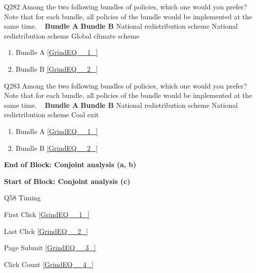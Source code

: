 \documentclass{article} %
\begin{document}
\noindent 

\noindent 

\noindent 

\noindent Q282 Among the two following bundles of policies, which one would you prefer?  Note that for each bundle, all policies of the bundle would be implemented at the same time. ~          \textbf{Bundle A}    \textbf{Bundle B}          National redistribution scheme    National redistribution scheme          Global climate scheme           

\begin{enumerate}
\item  Bundle A  \eqref{GrindEQ__1_} 

\item  Bundle B  \eqref{GrindEQ__2_} 
\end{enumerate}

\noindent 

\noindent 

\noindent 

\noindent Q283 Among the two following bundles of policies, which one would you prefer?  Note that for each bundle, all policies of the bundle would be implemented at the same time. ~          \textbf{Bundle A}    \textbf{Bundle B}          National redistribution scheme    National redistribution scheme          Coal exit           

\begin{enumerate}
\item  Bundle A  \eqref{GrindEQ__1_} 

\item  Bundle B  \eqref{GrindEQ__2_} 
\end{enumerate}

\noindent 

\noindent \textbf{End of Block: Conjoint analysis (a, b)}

\noindent \textbf{}

\noindent \textbf{Start of Block: Conjoint analysis (c)}

\noindent 

\noindent Q58 Timing

\noindent First Click  \eqref{GrindEQ__1_}

\noindent Last Click  \eqref{GrindEQ__2_}

\noindent Page Submit  \eqref{GrindEQ__3_}

\noindent Click Count  \eqref{GrindEQ__4_}

\noindent 

\noindent 
\end{document}
